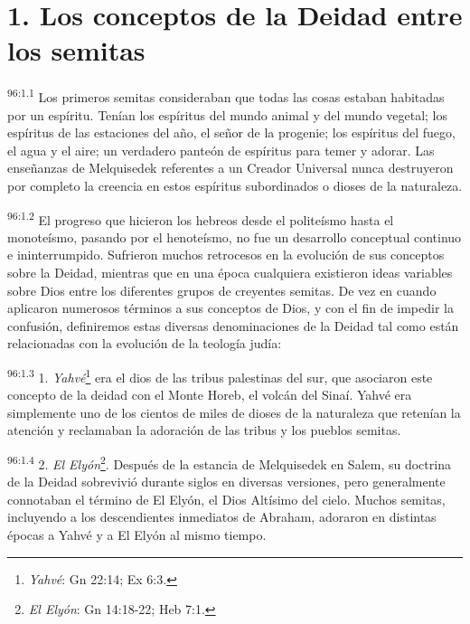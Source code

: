 \section*{1. Los conceptos de la Deidad entre los semitas}
\par
\textsuperscript{96:1.1} Los primeros semitas consideraban que todas las cosas estaban habitadas por un espíritu. Tenían los espíritus del mundo animal y del mundo vegetal; los espíritus de las estaciones del año, el señor de la progenie; los espíritus del fuego, el agua y el aire; un verdadero panteón de espíritus para temer y adorar. Las enseñanzas de Melquisedek referentes a un Creador Universal nunca destruyeron por completo la creencia en estos espíritus subordinados o dioses de la naturaleza.

\par
\textsuperscript{96:1.2} El progreso que hicieron los hebreos desde el politeísmo hasta el monoteísmo, pasando por el henoteísmo, no fue un desarrollo conceptual continuo e ininterrumpido. Sufrieron muchos retrocesos en la evolución de sus conceptos sobre la Deidad, mientras que en una época cualquiera existieron ideas variables sobre Dios entre los diferentes grupos de creyentes semitas. De vez en cuando aplicaron numerosos términos a sus conceptos de Dios, y con el fin de impedir la confusión, definiremos estas diversas denominaciones de la Deidad tal como están relacionadas con la evolución de la teología judía:

\par
\textsuperscript{96:1.3} 1. \textit{Yahvé}\footnote{\textit{Yahvé}: Gn 22:14; Ex 6:3.} era el dios de las tribus palestinas del sur, que asociaron este concepto de la deidad con el Monte Horeb, el volcán del Sinaí. Yahvé era simplemente uno de los cientos de miles de dioses de la naturaleza que retenían la atención y reclamaban la adoración de las tribus y los pueblos semitas.

\par
\textsuperscript{96:1.4} 2. \textit{El Elyón}\footnote{\textit{El Elyón}: Gn 14:18-22; Heb 7:1.}. Después de la estancia de Melquisedek en Salem, su doctrina de la Deidad sobrevivió durante siglos en diversas versiones, pero generalmente connotaban el término de El Elyón, el Dios Altísimo del cielo. Muchos semitas, incluyendo a los descendientes inmediatos de Abraham, adoraron en distintas épocas a Yahvé y a El Elyón al mismo tiempo.


